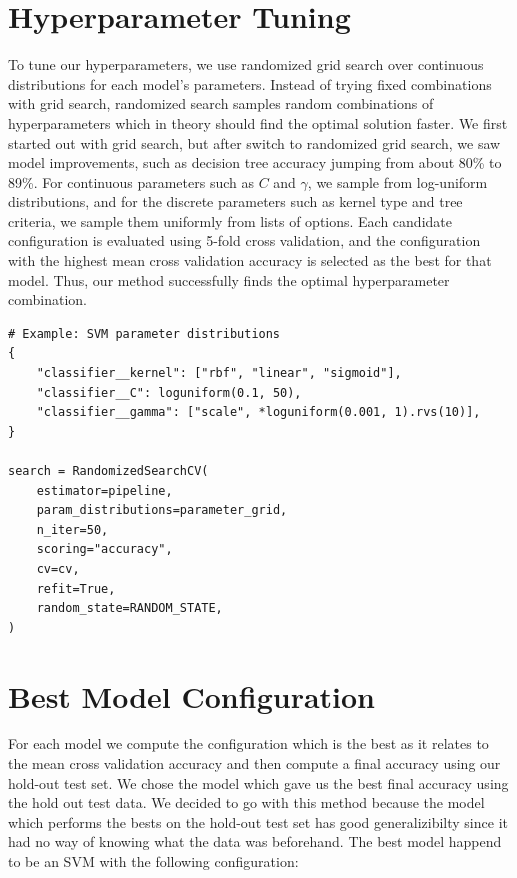 \documentclass[12pt]{fphw}
\begin{document}
\section*{Hyperparameter Tuning}

To tune our hyperparameters, we use randomized grid search over continuous distributions for each model's parameters.
Instead of trying fixed combinations with grid search, randomized search samples random combinations of hyperparameters
which in theory should find the optimal solution faster. We first started out with grid search, but after switch to randomized
grid search, we saw model improvements, such as decision tree accuracy jumping from about 80\% to 89\%.
For continuous parameters such as $C$ and $\gamma$, we sample from log-uniform distributions, and for the discrete parameters such as kernel 
type and tree criteria, we sample them uniformly from lists of options. Each candidate configuration is evaluated using
5-fold cross validation, and the configuration with the highest mean cross validation accuracy is selected as the best 
for that model. Thus, our method successfully finds the optimal hyperparameter combination.

\begin{lstlisting}
# Example: SVM parameter distributions
{
    "classifier__kernel": ["rbf", "linear", "sigmoid"],
    "classifier__C": loguniform(0.1, 50),
    "classifier__gamma": ["scale", *loguniform(0.001, 1).rvs(10)],
}

search = RandomizedSearchCV(
    estimator=pipeline,
    param_distributions=parameter_grid,
    n_iter=50,
    scoring="accuracy",
    cv=cv,
    refit=True,
    random_state=RANDOM_STATE,
)
\end{lstlisting}

\section*{Best Model Configuration}

For each model we compute the configuration which is the best as it relates to the mean cross validation accuracy and then
compute a final accuracy using our hold-out test set. We chose the model which gave us the best final accuracy using the hold out test data.
We decided to go with this method because the model which performs the bests on the hold-out test set has good generalizibilty since it had
no way of knowing what the data was beforehand. The best model happend to be an SVM with the following configuration:
\end{document}
